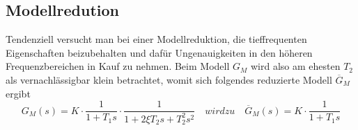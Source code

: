 \subsection{Modellredution}

Tendenziell versucht man bei einer Modellreduktion, die tieffrequenten Eigenschaften
beizubehalten und dafür Ungenauigkeiten in den höheren Frequenzbereichen in
Kauf zu nehmen. Beim Modell $G_M$ wird also am ehesten $T_2$ als vernachlässigbar
klein betrachtet, womit sich folgendes reduzierte Modell $\overline{G}_M$ ergibt
\[G_M(s)=K\cdot\frac{1}{1+T_1s}\cdot\frac{1}{1+2\xi T_2 s +T^2_2 s^2} \quad wird zu \quad \overline{G}_M(s)=K\cdot\frac{1}{1+T_1s}\]